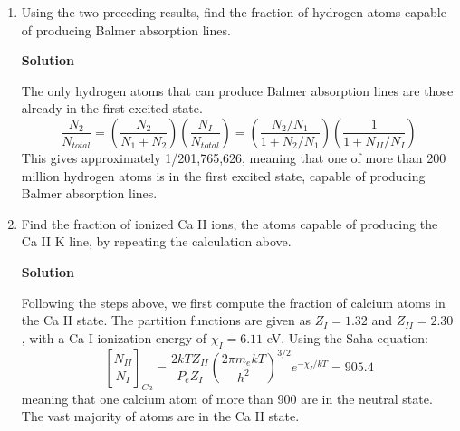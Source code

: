 \documentclass[12pt]{article}
\begin{document}
\begin{enumerate}[label=(\alph*)]
\item Using the two preceding results, find the fraction of hydrogen atoms capable of producing Balmer absorption lines.

\vspace{0.5cm}
\begin{adjustwidth}{2.5em}{0pt}
\begin{siderules}
 {\color{blue} \textbf{Solution}
 
The only hydrogen atoms that can produce Balmer absorption lines are those already in the first excited state.
\begin{equation}
\frac{N_2}{N_{total}} = \left(\frac{N_2}{N_1 + N_2}\right)\left(\frac{N_I}{N_{total}}\right) = \left(\frac{N_2/N_1}{1+N_2/N_1}\right)\left(\frac{1}{1+N_{II}/N_I}\right)
\end{equation}
This gives approximately 1/201,765,626, meaning that one of more than 200 million hydrogen atoms is in the first excited state, capable of producing Balmer absorption lines.
 }
\end{siderules}
\end{adjustwidth}

\item Find the fraction of ionized Ca II ions, the atoms capable of producing the Ca II K line, by repeating the calculation above.

\vspace{0.5cm}
\begin{adjustwidth}{2.5em}{0pt}
\begin{siderules}
 {\color{blue} \textbf{Solution}
 
Following the steps above, we first compute the fraction of calcium atoms in the Ca II state. The partition functions are given as $Z_I = 1.32$ and $Z_{II} = 2.30$, with a Ca I ionization energy of $\chi_I = 6.11$ eV. Using the Saha equation:
\begin{equation*}
\left[\frac{N_{II}}{N_I}\right]_{Ca} = \frac{2kTZ_{II}}{P_e Z_I}\left(\frac{2\pi m_e kT}{h^2}\right)^{3/2} e^{-\chi_I/kT} = 905.4
\end{equation*}
meaning that one calcium atom of more than 900 are in the neutral state. The vast majority of atoms are in the Ca II state.

}
\end{siderules}
\end{adjustwidth}
\end{enumerate}
\end{document}
